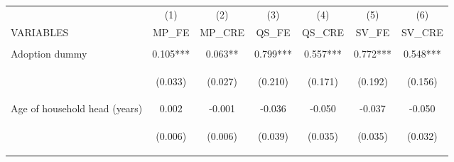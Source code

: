 \begin{center}
\begin{tabular}{lcccccc} \hline
 & (1) & (2) & (3) & (4) & (5) & (6) \\
VARIABLES & MP\_FE & MP\_CRE & QS\_FE & QS\_CRE & SV\_FE & SV\_CRE \\ \hline
\vspace{4pt} & \begin{footnotesize}\end{footnotesize} & \begin{footnotesize}\end{footnotesize} & \begin{footnotesize}\end{footnotesize} & \begin{footnotesize}\end{footnotesize} & \begin{footnotesize}\end{footnotesize} & \begin{footnotesize}\end{footnotesize} \\
Adoption dummy & 0.105*** & 0.063** & 0.799*** & 0.557*** & 0.772*** & 0.548*** \\
\vspace{4pt} & \begin{footnotesize}(0.033)\end{footnotesize} & \begin{footnotesize}(0.027)\end{footnotesize} & \begin{footnotesize}(0.210)\end{footnotesize} & \begin{footnotesize}(0.171)\end{footnotesize} & \begin{footnotesize}(0.192)\end{footnotesize} & \begin{footnotesize}(0.156)\end{footnotesize} \\
Age of household head (years) & 0.002 & -0.001 & -0.036 & -0.050 & -0.037 & -0.050 \\
\vspace{4pt} & \begin{footnotesize}(0.006)\end{footnotesize} & \begin{footnotesize}(0.006)\end{footnotesize} & \begin{footnotesize}(0.039)\end{footnotesize} & \begin{footnotesize}(0.035)\end{footnotesize} & \begin{footnotesize}(0.035)\end{footnotesize} & \begin{footnotesize}(0.032)\end{footnotesize} \\

\end{tabular}
\end{center}
